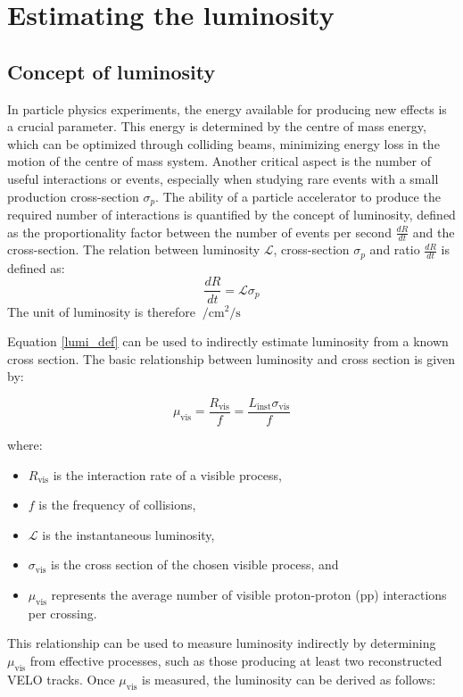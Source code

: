 \chapter{Estimating the luminosity}\label{chap:luminosity}

\section{Concept of luminosity}
In particle physics experiments, the energy available for producing new effects is a crucial parameter. This energy is determined by the centre of mass energy, which can be optimized through colliding beams, minimizing energy loss in the motion of the centre of mass system. Another critical aspect is the number of useful interactions or events, especially when studying rare events with a small production cross-section $\sigma_p$. The ability of a particle accelerator to produce the required number of interactions is quantified by the concept of luminosity, defined as the proportionality factor between the number of events per second $\tfrac{dR}{dt}$ and the cross-section. The relation between luminosity $\mathcal{L}$, cross-section $\sigma_p$ and ratio $\tfrac{dR}{dt}$ is defined as:
\begin{equation}
    \frac{dR}{dt} = \mathcal{L}{\sigma_p}\label{lumi_def}
\end{equation}
The unit of luminosity is therefore $\SI{}{\per\centi\meter\squared\per\second}$

Equation \ref{lumi_def} can be used to indirectly estimate luminosity from a known cross section. The basic relationship between luminosity and cross section is given by:

\begin{equation}
\mu_{\text{vis}} = \frac{R_{\text{vis}}}{f} = \frac{L_{\text{inst}} \sigma_{\text{vis}}}{f}\label{mu_def}
\end{equation}

where:
\begin{itemize}
\item  $R_{\text{vis}}$ is the interaction rate of a visible process,
\item  $f$ is the frequency of collisions,
\item  $\mathcal{L}$ is the instantaneous luminosity,
\item  $\sigma_{\text{vis}}$ is the cross section of the chosen visible process, and
\item  $\mu_{\text{vis}}$ represents the average number of visible proton-proton (pp) interactions per crossing.
\end{itemize}
This relationship can be used to measure luminosity indirectly by determining \(\mu_{\text{vis}}\) from effective processes, such as those producing at least two reconstructed VELO tracks. Once \(\mu_{\text{vis}}\) is measured, the luminosity can be derived as follows:


